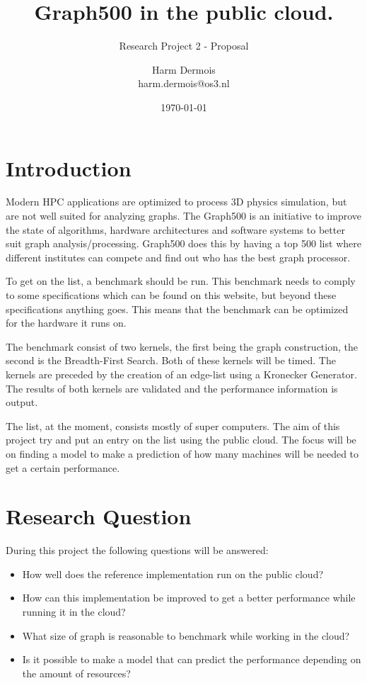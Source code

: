 \documentclass[A4]{scrartcl}
\begin{document}
\title{Graph500 in the public cloud.}
\subtitle{Research Project 2 - Proposal}
\date{\today}
\author{Harm Dermois \\ harm.dermois@os3.nl}

\maketitle
\newpage
\tableofcontents
\newpage

\section{Introduction}
\label{sec:introduction}
Modern HPC applications are optimized to process 3D physics simulation, but are not well suited for analyzing graphs. The Graph500 \cite{murphy2010introducing} is an initiative to improve the state of algorithms, hardware architectures and software systems to better suit graph analysis/processing. Graph500 does this by having a top 500 list where different institutes can compete and find out who has the best graph processor.

To get on the list, a benchmark should be run. This benchmark needs to comply to some specifications which can be found on this website\cite{graph500-specs}, but beyond these specifications anything goes. This means that the benchmark can be optimized for the hardware it runs on. 

The benchmark consist of two kernels, the first being the graph construction, the second is the Breadth-First Search. Both of these kernels will be timed. The kernels are preceded by the creation of an edge-list using a Kronecker Generator\cite{leskovec2010kronecker}. The results of both kernels are validated and the performance information is output. 

The list, at the moment, consists mostly of super computers. The aim of this project try and put an entry on the list using the public cloud. The focus will be on finding a model to make a prediction of how many machines will be needed to get a certain performance.

\section{Research Question}
During this project the following questions will be answered:
\begin{itemize}
\item How well does the reference implementation\cite{graph500-code} run on the public cloud?
\item How can this implementation be improved to get a better performance while running it in the cloud?
\item What size of graph is reasonable to benchmark while working in the cloud?
\item Is it possible to make a model that can predict the performance depending on the amount of resources?
\end{itemize}
\end{document}
